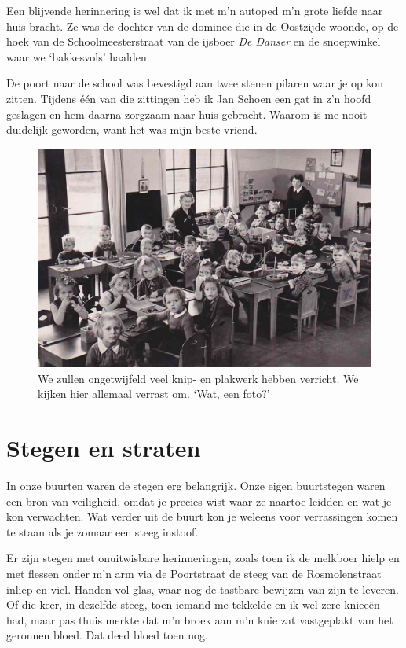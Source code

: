 \documentclass[12pt,twoside, openright]{memoir}
\begin{document}
Een blijvende herinnering is wel dat ik met m’n autoped m’n grote liefde naar huis bracht. Ze was de dochter van de dominee die in de Oostzijde woonde, op de hoek van de Schoolmeesterstraat van de ijsboer \emph{De Danser} en de snoepwinkel waar we ‘bakkesvols’ haalden. 

De poort naar de school was bevestigd aan twee stenen pilaren waar je op kon zitten. Tijdens één van die zittingen heb ik Jan Schoen een gat in z’n hoofd geslagen en hem daarna zorgzaam naar huis gebracht. Waarom is me nooit duidelijk geworden, want het was mijn beste vriend. 

\begin{figure}
\includegraphics[width=\textwidth]{img/ch6/kleuterschool2}
\caption*{\footnotesize We zullen ongetwijfeld veel knip- en plakwerk hebben verricht. We kijken hier allemaal verrast om. ‘Wat, een foto?’}
\end{figure}

\chapter{Stegen en straten} %
\label{cha:stegen_straten}

In onze buurten waren de stegen erg belangrijk. Onze eigen buurtstegen waren een bron van veiligheid, omdat je precies wist waar ze naartoe leidden en wat je kon verwachten. Wat verder uit de buurt kon je weleens voor verrassingen komen te staan als je zomaar een steeg instoof. 

Er zijn stegen met onuitwisbare herinneringen, zoals toen ik de melkboer hielp en met flessen onder m’n arm via de Poortstraat de steeg van de Rosmolenstraat inliep en viel. Handen vol glas, waar nog de tastbare bewijzen van zijn te leveren. Of die keer, in dezelfde steeg, toen iemand me tekkelde en ik wel zere knieeën had, maar pas thuis merkte dat m’n broek aan m’n knie zat vastgeplakt van het geronnen bloed. Dat deed bloed toen nog.
\end{document}
